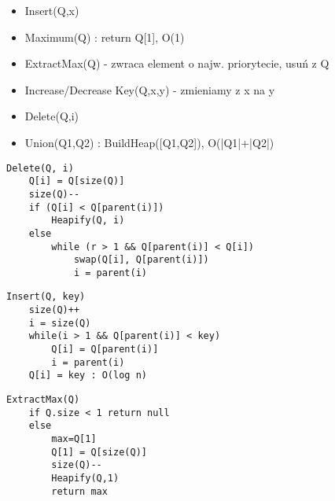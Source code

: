 \documentclass{article}
\numberwithin{equation}{subsection}
\begin{document}
\begin{itemize}
    \item Insert(Q,x)
    \item Maximum(Q) : return Q[1], O(1)
    \item ExtractMax(Q) - zwraca element o najw. priorytecie, usuń z Q
    \item Increase/Decrease Key(Q,x,y) - zmieniamy z x na y
    \item Delete(Q,i)
    \item Union(Q1,Q2) : BuildHeap([Q1,Q2]), O(|Q1|+|Q2|)
\end{itemize}

\begin{verbatim}
Delete(Q, i)
    Q[i] = Q[size(Q)]
    size(Q)--
    if (Q[i] < Q[parent(i)])
        Heapify(Q, i)
    else
        while (r > 1 && Q[parent(i)] < Q[i])
            swap(Q[i], Q[parent(i)])
            i = parent(i)
\end{verbatim}

\begin{verbatim}
Insert(Q, key)
    size(Q)++
    i = size(Q)
    while(i > 1 && Q[parent(i)] < key)
        Q[i] = Q[parent(i)]
        i = parent(i)
    Q[i] = key : O(log n)
\end{verbatim}

\begin{verbatim}
ExtractMax(Q)
    if Q.size < 1 return null
    else
        max=Q[1]
        Q[1] = Q[size(Q)]
        size(Q)--
        Heapify(Q,1)
        return max
\end{verbatim}
\end{document}
